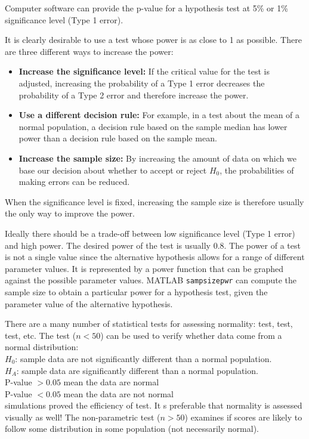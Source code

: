 Computer software can provide the p-value for a hypothesis test at 5\% or 1\% significance level (Type 1 error).

It is clearly desirable to use a test whose power is as close to 1 as possible. There are three different ways to increase the power:
\begin{itemize}
    \item \textbf{Increase the significance level:} If the critical value for the test is adjusted, increasing the probability of a Type 1 error decreases the probability of a Type 2 error and therefore increase the power.
    \item \textbf{Use a different decision rule:} For example, in a test about the mean of a normal population, a decision rule based on the sample median has lower power than a decision rule based on the sample mean.
    \item \textbf{Increase the sample size:} By increasing the amount of data on which we base our decision about whether to accept or reject $H_0$, the probabilities of making errors can be reduced.
\end{itemize}

When the significance level is fixed, increasing the sample size is therefore usually the only way to improve the power.

Ideally there should be a trade-off between low significance level (Type 1 error) and high power. The desired power of the test is usually 0.8. The power of a test is not a single value since the alternative hypothesis allows for a range of different parameter values. It is represented by a power function that can be graphed against the possible parameter values. MATLAB \texttt{sampsizepwr} can compute the sample size to obtain a particular power for a hypothesis test, given the parameter value of the alternative hypothesis.



There are a many number of statistical tests for assessing normality:  test,  test,  test, etc. The  test ($n<50$) can be used to verify whether data come from a normal distribution: \\
$H_0$: sample data are not significantly different than a normal population. \\
$H_A$: sample data are significantly different than a normal population. \\
P-value $>0.05$ mean the data are normal \\
P-value $<0.05$ mean the data are not normal \\
 simulations proved the efficiency of  test. It s preferable that normality is assessed visually as well! The  non-parametric test ($n>50$) examines if scores are likely to follow some distribution in some population (not necessarily normal).